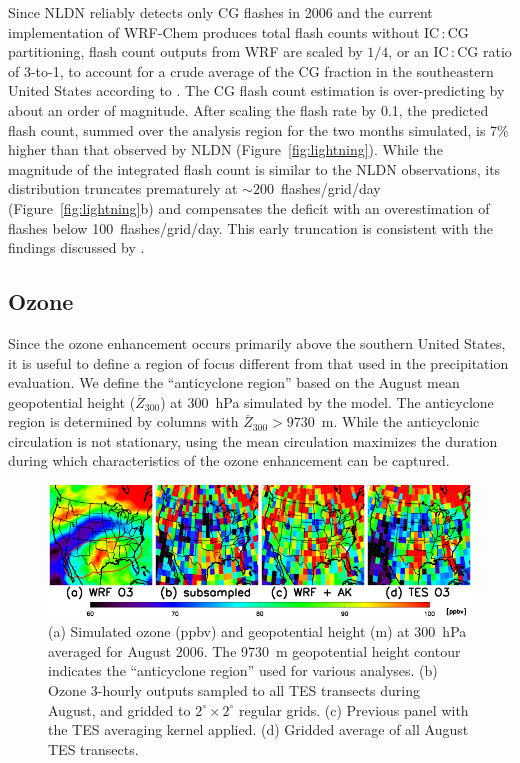 Since NLDN reliably detects only CG flashes in 2006 and the current implementation of
WRF-Chem produces total flash counts without IC\,:\,CG partitioning, flash count outputs
from WRF are scaled by $1/4$, or an IC\,:\,CG ratio of 3-to-1, to account for a crude average
of the CG fraction in the southeastern United States according to \citet{Boccippio:2001ys}.
The \citet{Price:1992wb} CG flash count estimation is over-predicting by about an order of magnitude.
After scaling the flash rate by 0.1, the predicted flash count, summed over the analysis region for the two months
simulated, is 7\% higher than that observed by NLDN (Figure~\ref{fig:lightning}).
While the magnitude of the integrated flash count is similar to the NLDN observations,
its distribution truncates prematurely at $\sim200$~flashes/grid/day (Figure~\ref{fig:lightning}b) and compensates 
the deficit with an overestimation of flashes below
100~flashes/grid/day. This early truncation is consistent with the findings discussed by
\citet{Wong:2013vn}.

\subsection{Ozone}\label{sect:val/o3}

Since the ozone enhancement occurs primarily above the southern United States, it is
useful to define a region of focus different from that used in the precipitation evaluation.
We define the ``anticyclone region'' based on the August mean geopotential height
($\overline Z_{300}$) at 300~hPa simulated by the model. The anticyclone region is determined
by columns with $\overline Z_{300}>9730$~m. While the anticyclonic circulation is not stationary, using
the mean circulation maximizes the duration during which characteristics of the ozone
enhancement can be captured.

 \begin{figure}
 \noindent\includegraphics[width=40pc]{Figures/o3/tes08_o3.png}
 \caption[August mean ozone at 300~hPa]{(a) Simulated ozone (ppbv) and geopotential height (m) at 300~hPa averaged for August
2006. The 9730~m geopotential height contour indicates the ``anticyclone region'' used for
various analyses. (b) Ozone 3-hourly outputs sampled to all TES transects during August, and gridded
to $2^\circ\times2^\circ$ regular grids. (c) Previous panel with the TES averaging kernel applied.
(d) Gridded average of all August TES transects.}
 \label{fig:o3_map}
 \end{figure}

